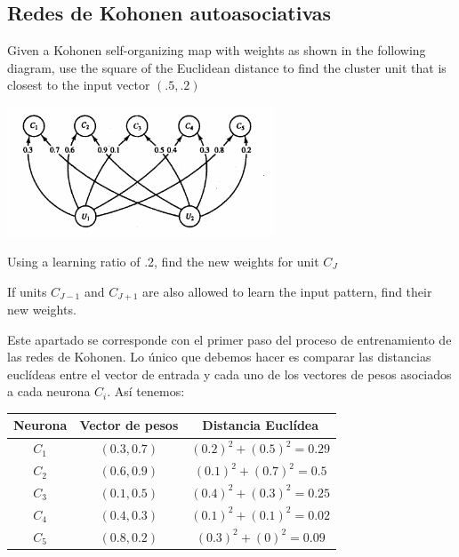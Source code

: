 \subsection{Redes de Kohonen autoasociativas}
\begin{problem}[2]\label{ej:kohonenGraph}
\ppart  Given a Kohonen self-organizing map with weights as shown in the following
diagram, use the square of the Euclidean distance to find the cluster unit that
is closest to the input vector $(.5,.2)$
\begin{center}
\includegraphics[width=0.6\textwidth]{img/figure4-2.png}
\end{center}

\ppart
Using a learning ratio of .2, find the new weights for unit $C_J$

\ppart If units $C_{J-1}$ and $C_{J+1}$ are also allowed to learn the input pattern, find their new weights.
\solution
{}

\spart

Este apartado se corresponde con el primer paso del proceso de entrenamiento de las redes de Kohonen. Lo único que debemos hacer es comparar las distancias euclídeas entre el vector de entrada y cada uno de los vectores de pesos asociados a cada neurona $C_i$. Así tenemos:

\begin{center}
\begin{tabular}{|c|c|c|}
\hline
\textbf{Neurona}  & \textbf{Vector de pesos} & \textbf{Distancia Euclídea}\\
\hline
$C_1$ & $(0.3, 0.7)$ & $(0.2)^2 + (0.5)^2 = 0.29$\\
$C_2$ & $(0.6, 0.9)$ & $(0.1)^2 + (0.7)^2 = 0.5$\\
$C_3$ & $(0.1, 0.5)$ & $(0.4)^2 + (0.3)^2 = 0.25$\\
$C_4$ & $(0.4, 0.3)$ & $(0.1)^2 + (0.1)^2 = 0.02$\\
$C_5$ & $(0.8, 0.2)$ & $(0.3)^2 + (0)^2 = 0.09$\\
\hline
\end{tabular}
\end{center}


\end{problem}
